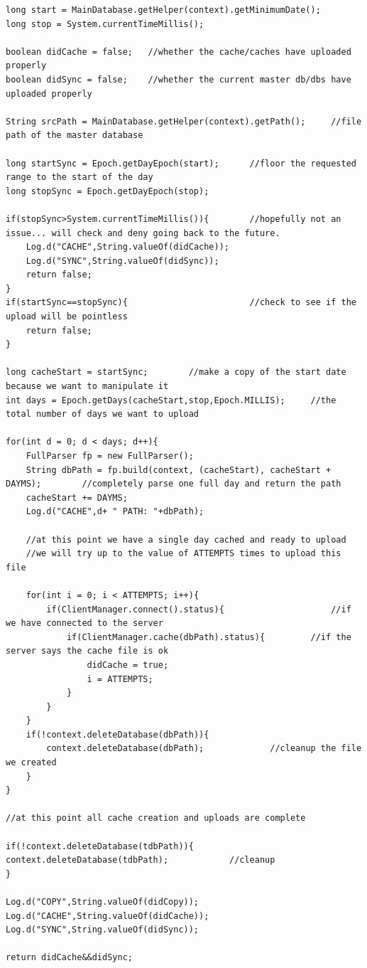 \documentclass[a4wide]{article}
\begin{document}
\begin{lstlisting}
long start = MainDatabase.getHelper(context).getMinimumDate();
long stop = System.currentTimeMillis();
		
boolean didCache = false;	//whether the cache/caches have uploaded properly
boolean didSync = false;	//whether the current master db/dbs have uploaded properly
		
String srcPath = MainDatabase.getHelper(context).getPath();		//file path of the master database
		
long startSync = Epoch.getDayEpoch(start);		//floor the requested range to the start of the day
long stopSync = Epoch.getDayEpoch(stop);
		
if(stopSync>System.currentTimeMillis()){		//hopefully not an issue... will check and deny going back to the future.
	Log.d("CACHE",String.valueOf(didCache));
	Log.d("SYNC",String.valueOf(didSync));
	return false;
}
if(startSync==stopSync){						//check to see if the upload will be pointless
	return false;
}

long cacheStart = startSync;		//make a copy of the start date because we want to manipulate it
int days = Epoch.getDays(cacheStart,stop,Epoch.MILLIS);		//the total number of days we want to upload

for(int d = 0; d < days; d++){
    FullParser fp = new FullParser();
    String dbPath = fp.build(context, (cacheStart), cacheStart + DAYMS);		//completely parse one full day and return the path
	cacheStart += DAYMS;
	Log.d("CACHE",d+ " PATH: "+dbPath);
			
	//at this point we have a single day cached and ready to upload
	//we will try up to the value of ATTEMPTS times to upload this file
			
	for(int i = 0; i < ATTEMPTS; i++){
		if(ClientManager.connect().status){						//if we have connected to the server
			if(ClientManager.cache(dbPath).status){			//if the server says the cache file is ok
				didCache = true;
				i = ATTEMPTS;
			}
		}
	}
	if(!context.deleteDatabase(dbPath)){
		context.deleteDatabase(dbPath);				//cleanup the file we created
	}
}
		
//at this point all cache creation and uploads are complete

if(!context.deleteDatabase(tdbPath)){
context.deleteDatabase(tdbPath);			//cleanup
}

Log.d("COPY",String.valueOf(didCopy));
Log.d("CACHE",String.valueOf(didCache));
Log.d("SYNC",String.valueOf(didSync));

return didCache&&didSync;
\end{lstlisting}
\end{document}
